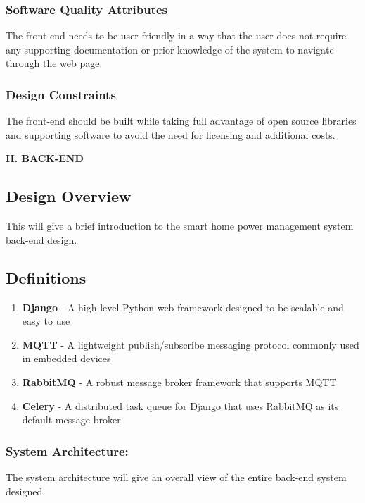 \documentclass[10pt,twocolumn]{witseiepaper}
\begin{document}
	\subsubsection{Software Quality Attributes}
	The front-end needs to be user friendly in a way that the user does not require any supporting documentation or prior knowledge of the system to navigate through the web page.
	\subsubsection{Design Constraints}
	The front-end should be built while taking full advantage of open source libraries and supporting software to avoid the need for licensing and additional costs.

	\newpage
	\begin{center}
		\textbf{II. BACK-END}
	\end{center}
	
	\subsection{Design Overview}
	This will give a brief introduction to the smart home power management system back-end design. 
	
	\subsection{Definitions}
	\begin{enumerate}
		\item \textbf{Django} - A high-level Python web framework designed to be scalable and easy to use
		\item \textbf{MQTT} - A lightweight publish/subscribe messaging protocol commonly used in embedded devices \cite{mqtt}
		\item \textbf{RabbitMQ} - A robust message broker framework that supports MQTT \cite{rabbitmq}
		\item \textbf{Celery} - A distributed task queue for Django that uses RabbitMQ as its default message broker \cite{celery}
	\end{enumerate}
	
	\subsubsection{System Architecture:}
	The system architecture will give an overall view of the entire back-end system designed. 
	
\end{document}
